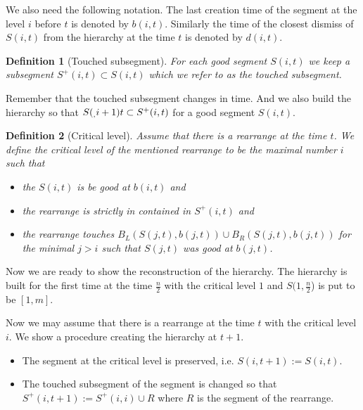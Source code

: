 \documentclass[11pt]{article} %
\newcommand{\segment}[2]{S(#1, #2)}
\newcommand{\segmentt}[2]{S^+(#1, #2)}
\newtheorem{definition}{Definition} %
\begin{document}
We also need the following notation. The last creation time of the segment at the level $i$ before $t$ is denoted by $b(i, t)$. Similarly the time of the closest dismiss of $\segment{i}{t}$ from the hierarchy at the time $t$ is denoted by $d(i, t)$.

\begin{definition}[Touched subsegment]
For each good segment $\segment{i}{t}$ we keep a subsegment $\segmentt{i}{t} \subset \segment{i}{t}$ which we refer to as the touched subsegment.
\end{definition}
Remember that the touched subsegment changes in time. And we also build the hierarchy so that $\segment_{i + 1}{t} \subset \segmentt{i}{t}$ for a good segment $\segment{i}{t}$.

\begin{definition}[Critical level]
Assume that there is a rearrange at the time $t$. We define the \emph{critical level} of the mentioned rearrange to be the maximal number $i$ such that 
\begin{itemize}
	\item the $\segment{i}{t}$ is be good at $b(i, t)$ and
	\item the rearrange is strictly in contained in $\segmentt{i}{t}$ and
	\item the rearrange touches $B_L(\segment{j}{t}, b(j, t)) \cup B_R(\segment{j}{t}, b(j, t))$ for the minimal $j > i$ such that $\segment{j}{t}$ was good at $b(j, t)$.
\end{itemize}
\end{definition}

Now we are ready to show the reconstruction of the hierarchy. 
The hierarchy is built for the first time at the time $\frac{n}{2}$ with the critical level $1$ and $\segment{1}{\frac{n}{2}$} is put to be $[1, m]$.

Now we may assume that there is a rearrange at the time $t$ with the critical level $i$. We show a procedure creating the hierarchy at $t + 1$.
\begin{itemize}
	\item The segment at the critical level is preserved, i.e. $\segment{i}{t + 1} := \segment{i}{t}$.
	\item The touched subsegment of the segment is changed so that $\segmentt{i}{t + 1} := \segmentt{i}{i} \cup R$ where $R$  is the segment of the rearrange.
\end{itemize}
\end{document}
